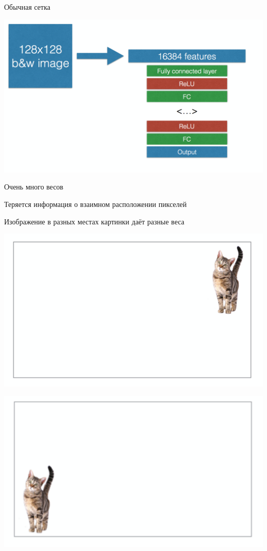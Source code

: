 \documentclass[notes,12pt, aspectratio=169]{beamer}
\newenvironment{wideitemize}{\itemize\addtolength{\itemsep}{10pt}}{\enditemize}
\begin{document}


\begin{frame}{Обычная сетка}
\begin{center}
	\includegraphics[width=.6\linewidth]{not_conv.png}
\end{center}

\begin{wideitemize}
	\item Очень много весов 
	\item Теряется информация о взаимном расположении пикселей
	\item Изображение в разных местах картинки даёт разные веса
\end{wideitemize}
\end{frame}


\begin{frame}
\begin{center}
	\includegraphics[width=.8\linewidth]{cat_1.png}
\end{center}
\end{frame}


\begin{frame}
\begin{center}
	\includegraphics[width=.8\linewidth]{cat_2.png}
\end{center}
\end{frame}
\end{document}
